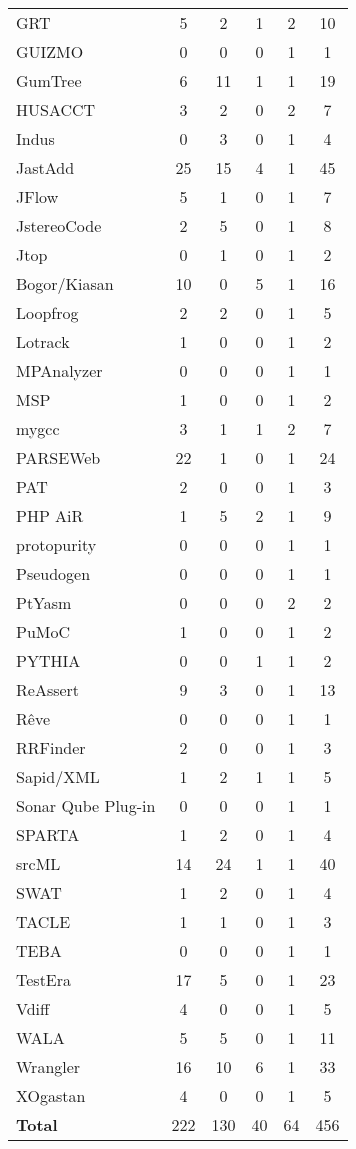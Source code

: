 \begin{longtable}{ l c c c c c }
   GRT & 5 & 2 & 1 & 2 & 10 \\
   GUIZMO & 0 & 0 & 0 & 1 & 1 \\
   GumTree & 6 & 11 & 1 & 1 & 19 \\
   HUSACCT & 3 & 2 & 0 & 2 & 7 \\
   Indus & 0 & 3 & 0 & 1 & 4 \\
   JastAdd & 25 & 15 & 4 & 1 & 45 \\
   JFlow & 5 & 1 & 0 & 1 & 7 \\
   JstereoCode & 2 & 5 & 0 & 1 & 8 \\
   Jtop & 0 & 1 & 0 & 1 & 2 \\
   Bogor/Kiasan & 10 & 0 & 5 & 1 & 16 \\
   Loopfrog & 2 & 2 & 0 & 1 & 5 \\
   Lotrack & 1 & 0 & 0 & 1 & 2 \\
   MPAnalyzer & 0 & 0 & 0 & 1 & 1 \\
   MSP & 1 & 0 & 0 & 1 & 2 \\
   mygcc & 3 & 1 & 1 & 2 & 7 \\
   PARSEWeb & 22 & 1 & 0 & 1 & 24 \\
   PAT & 2 & 0 & 0 & 1 & 3 \\
   PHP AiR & 1 & 5 & 2 & 1 & 9 \\
   protopurity & 0 & 0 & 0 & 1 & 1 \\
   Pseudogen & 0 & 0 & 0 & 1 & 1 \\
   PtYasm & 0 & 0 & 0 & 2 & 2 \\
   PuMoC & 1 & 0 & 0 & 1 & 2 \\
   PYTHIA & 0 & 0 & 1 & 1 & 2 \\
   ReAssert & 9 & 3 & 0 & 1 & 13 \\
   Rêve & 0 & 0 & 0 & 1 & 1 \\
   RRFinder & 2 & 0 & 0 & 1 & 3 \\
   Sapid/XML & 1 & 2 & 1 & 1 & 5 \\
   Sonar Qube Plug-in & 0 & 0 & 0 & 1 & 1 \\
   SPARTA & 1 & 2 & 0 & 1 & 4 \\
   srcML & 14 & 24 & 1 & 1 & 40 \\
   SWAT & 1 & 2 & 0 & 1 & 4 \\
   TACLE & 1 & 1 & 0 & 1 & 3 \\
   TEBA & 0 & 0 & 0 & 1 & 1 \\
   TestEra & 17 & 5 & 0 & 1 & 23 \\
   Vdiff & 4 & 0 & 0 & 1 & 5 \\
   WALA & 5 & 5 & 0 & 1 & 11 \\
   Wrangler & 16 & 10 & 6 & 1 & 33 \\
   XOgastan & 4 & 0 & 0 & 1 & 5 \\
  \hline
  {\bf Total} & 222 & 130 & 40 & 64 & 456 \\
\end{longtable}

